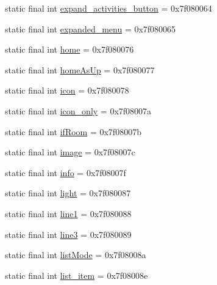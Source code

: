 \begin{DoxyCompactItemize}
\item 
static final int \mbox{\hyperlink{classcom_1_1google_1_1android_1_1gms_1_1R_1_1id_adba4f96cf8a8e6a7e68a9f7747d3eace}{expand\+\_\+activities\+\_\+button}} = 0x7f080064
\item 
static final int \mbox{\hyperlink{classcom_1_1google_1_1android_1_1gms_1_1R_1_1id_adf6108fdec7fa68050e0e495893c4142}{expanded\+\_\+menu}} = 0x7f080065
\item 
static final int \mbox{\hyperlink{classcom_1_1google_1_1android_1_1gms_1_1R_1_1id_ab026b57ff190bf53948a796203acef58}{home}} = 0x7f080076
\item 
static final int \mbox{\hyperlink{classcom_1_1google_1_1android_1_1gms_1_1R_1_1id_ae3d46a1c9f07b57b217627ae3875536a}{home\+As\+Up}} = 0x7f080077
\item 
static final int \mbox{\hyperlink{classcom_1_1google_1_1android_1_1gms_1_1R_1_1id_aa579a5eea19f84ddbce4146e867c3254}{icon}} = 0x7f080078
\item 
static final int \mbox{\hyperlink{classcom_1_1google_1_1android_1_1gms_1_1R_1_1id_a8beffd04f17824024baddd18e9f47700}{icon\+\_\+only}} = 0x7f08007a
\item 
static final int \mbox{\hyperlink{classcom_1_1google_1_1android_1_1gms_1_1R_1_1id_a5adb1e11a6271d72575d0286ed35235e}{if\+Room}} = 0x7f08007b
\item 
static final int \mbox{\hyperlink{classcom_1_1google_1_1android_1_1gms_1_1R_1_1id_a9af42836090aab5bab10b0814faa6919}{image}} = 0x7f08007c
\item 
static final int \mbox{\hyperlink{classcom_1_1google_1_1android_1_1gms_1_1R_1_1id_a6b3588a4729ae27a80b221eb09d5fef1}{info}} = 0x7f08007f
\item 
static final int \mbox{\hyperlink{classcom_1_1google_1_1android_1_1gms_1_1R_1_1id_ab5f5dd530ffef58b4ce8e17b83cc888e}{light}} = 0x7f080087
\item 
static final int \mbox{\hyperlink{classcom_1_1google_1_1android_1_1gms_1_1R_1_1id_a2312c51c73cdca7902d6219070b5240e}{line1}} = 0x7f080088
\item 
static final int \mbox{\hyperlink{classcom_1_1google_1_1android_1_1gms_1_1R_1_1id_afd54ffa2d16cc22b442af0c715594464}{line3}} = 0x7f080089
\item 
static final int \mbox{\hyperlink{classcom_1_1google_1_1android_1_1gms_1_1R_1_1id_a7c139308044e29fda186681f2431aacf}{list\+Mode}} = 0x7f08008a
\item 
static final int \mbox{\hyperlink{classcom_1_1google_1_1android_1_1gms_1_1R_1_1id_a34fd30043adcef6d9bc55e64edd4860f}{list\+\_\+item}} = 0x7f08008e

\end{DoxyCompactItemize}
